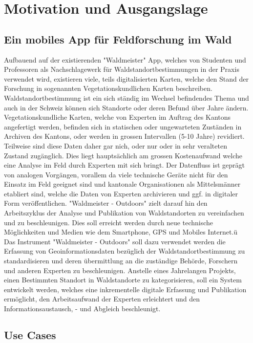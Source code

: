 
\chapter{Motivation und Ausgangslage}
\section{Ein mobiles App f\"ur Feldforschung im Wald}
Aufbauend auf der existierenden "Waldmeister" App, welches von Studenten und Professoren als Nachschlagewerk f\"ur Waldstandortbestimmungen in der Praxis verwendet wird, existieren viele, teils digitalisierten Karten, welche den Stand der Forschung in sogenannten Vegetationskundlichen Karten beschreiben. Waldstandortbestimmung ist ein sich st\"andig im Wechsel befindendes Thema und auch in der Schweiz k\"onnen sich Standorte oder deren Befund \"uber Jahre \"andern. Vegetationskundliche Karten, welche von Experten im Auftrag des Kantons angefertigt werden, befinden sich in statischen oder ungewarteten Zust\"anden in Archiven des Kantons, oder werden in grossen Intervallen (5-10 Jahre) revidiert. Teilweise sind diese Daten daher gar nich, oder nur oder in sehr veralteten Zustand zug\"anglich.
Dies liegt haupts\"achlich am grossen Kostenaufwand welche eine Analyse im Feld durch Experten mit sich bringt. Der Datenfluss ist gepr\"agt von analogen Vorg\"angen, vorallem da viele technische Ger\"ate nicht f\"ur den Einsatz im Feld geeignet sind und kantonale Organisationen als Mittelsm\"anner etabliert sind, welche die Daten von Experten archivieren und ggf. in digitaler Form ver\"offentlichen. "Waldmeister - Outdoors" zielt darauf hin den Arbeitszyklus der Analyse und Publikation von Waldstandorten zu vereinfachen und zu beschleunigen. Dies soll erreicht werden durch neue technische M\"oglichkeiten und Medien wie dem Smartphone, GPS und Mobiles Internet.\"u
Das Instrument "Waldmeister - Outdoors" soll dazu verwendet werden die Erfassung von Geoinformationsdaten bez\"uglich der Waldstandortbestimmung zu standardisieren und deren \"ubermittlung an die zust\"andige Beh\"orde, Forschern und anderen Experten zu beschleunigen. Anstelle eines Jahrelangen Projekts, einen Bestimmten Standort in Waldstandorte zu kategorisieren, soll ein System entwickelt werden, welches eine inkrementelle digitale Erfassung und Publikation erm\"oglicht, den Arbeitsaufwand der Experten erleichtert und den Informationsaustausch, - und Abgleich beschleunigt.

\section{Use Cases}
